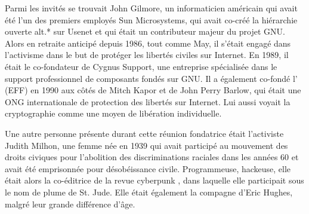 Parmi les invités se trouvait John Gilmore, un informaticien américain qui avait été l'un des premiers employés Sun Microsystems, qui avait co-créé la hiérarchie ouverte alt.* sur Usenet et qui était un contributeur majeur du projet GNU. Alors en retraite anticipé depuis 1986, tout comme May, il s'était engagé dans l'activisme dans le but de protéger les libertés civiles sur Internet. En 1989, il était le co-fondateur de Cygnus Support, une entreprise spécialisée dans le support professionnel de composants fondés sur GNU. Il a également co-fondé l' (EFF) en 1990 aux côtés de Mitch Kapor et de John Perry Barlow, qui était une ONG internationale de protection des libertés sur Internet. Lui aussi voyait la cryptographie comme une moyen de libération individuelle. %

Une autre personne présente durant cette réunion fondatrice était l'activiste Judith Milhon, une femme née en 1939 qui avait participé au mouvement des droits civiques pour l'abolition des discriminations raciales dans les années 60 et avait été emprisonnée pour désobéissance civile. Programmeuse, hackeuse, elle était alors la co-éditrice de la revue cyberpunk , dans laquelle elle participait sous le nom de plume de St. Jude. Elle était également la compagne d'Eric Hughes, malgré leur grande différence d'âge.

